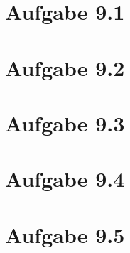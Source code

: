\documentclass{theozettel}
\begin{document}

\section*{Aufgabe 9.1} 




\section*{Aufgabe 9.2} 



\section*{Aufgabe 9.3} 



\section*{Aufgabe 9.4} 



\section*{Aufgabe 9.5} 
\end{document}
